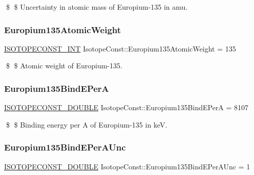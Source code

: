 \$ \$ Uncertainty in atomic mass of Europium-\/135 in amu. \mbox{\label{group___isotope_const-_europium-_eu135_gaccc660a3d5eacba1a0100d15e1c5dffd}} 
\subsubsection{\texorpdfstring{Europium135\+Atomic\+Weight}{Europium135AtomicWeight}}
{\footnotesize\ttfamily \mbox{\hyperlink{group___isotope_const-_macros_ga5f18360b3e99483a35c32d789e62621c}{I\+S\+O\+T\+O\+P\+E\+C\+O\+N\+S\+T\+\_\+\+I\+NT}} Isotope\+Const\+::\+Europium135\+Atomic\+Weight = 135}

\$ \$ Atomic weight of Europium-\/135. \mbox{\label{group___isotope_const-_europium-_eu135_ga332568ddc3b1a6b7819c337f4fb970d6}} 
\subsubsection{\texorpdfstring{Europium135\+Bind\+E\+PerA}{Europium135BindEPerA}}
{\footnotesize\ttfamily \mbox{\hyperlink{group___isotope_const-_macros_ga8f45a7272ce02c0b4c65c44636ed719a}{I\+S\+O\+T\+O\+P\+E\+C\+O\+N\+S\+T\+\_\+\+D\+O\+U\+B\+LE}} Isotope\+Const\+::\+Europium135\+Bind\+E\+PerA = 8107}

\$ \$ Binding energy per A of Europium-\/135 in keV. \mbox{\label{group___isotope_const-_europium-_eu135_ga8d07e104fd3b0e3c6d61a3199fa522b0}} 
\subsubsection{\texorpdfstring{Europium135\+Bind\+E\+Per\+A\+Unc}{Europium135BindEPerAUnc}}
{\footnotesize\ttfamily \mbox{\hyperlink{group___isotope_const-_macros_ga8f45a7272ce02c0b4c65c44636ed719a}{I\+S\+O\+T\+O\+P\+E\+C\+O\+N\+S\+T\+\_\+\+D\+O\+U\+B\+LE}} Isotope\+Const\+::\+Europium135\+Bind\+E\+Per\+A\+Unc = 1}

